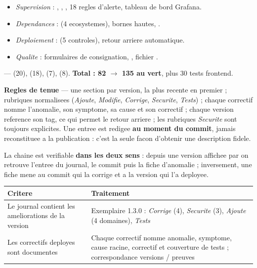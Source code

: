 \begin{minipage}{\linewidth}
{\begin{minipage}{\dimexpr\linewidth-2\fboxsep-2\fboxrule}
\begin{itemize}[leftmargin=*,itemsep=1pt,topsep=2pt]
  \item \emph{Supervision} : , , ,
        18 regles d'alerte, tableau de bord Grafana.
  \item \emph{Dependances} :  (4 ecosystemes), bornes hautes,
        .
  \item \emph{Deploiement} :  (5 controles), retour arriere automatique.
  \item \emph{Qualite} : formulaires de consignation, , fichier .
\end{itemize}

 ---  (20),
 (18),  (7),
 (8). \textbf{Total : 82 $\rightarrow$ 135 au vert}, plus 30
tests frontend.
\end{minipage}}
\end{minipage}

\vspace{5pt}
\textbf{Regles de tenue} --- une section par version, la plus recente en premier ; rubriques
normalisees (\emph{Ajoute}, \emph{Modifie}, \emph{Corrige}, \emph{Securite}, \emph{Tests}) ; chaque
correctif nomme l'anomalie, son symptome, sa cause et son correctif ; chaque version reference son
tag, ce qui permet le retour arriere ; les rubriques \emph{Securite} sont toujours explicites. Une
entree est redigee \textbf{au moment du commit}, jamais reconstituee a la publication : c'est la
seule facon d'obtenir une description fidele.

La chaine est verifiable \textbf{dans les deux sens} : depuis une version affichee par
 on retrouve l'entree du journal, le commit puis la fiche d'anomalie ;
inversement, une fiche mene au commit qui la corrige et a la version qui l'a deployee.

\couverture
\footnotesize
\begin{tabularx}{\linewidth}{@{}L{4.4cm} X@{}}
\toprule
\textbf{Critere} & \textbf{Traitement} \\
\midrule
Le journal contient les ameliorations de la version & Exemplaire 1.3.0 : \emph{Corrige} (4), \emph{Securite} (3), \emph{Ajoute} (4 domaines), \emph{Tests} \\
Les correctifs deployes sont documentes & Chaque correctif nomme anomalie, symptome, cause racine, correctif et couverture de tests ; correspondance versions / preuves \\
\bottomrule
\end{tabularx}
\normalsize

